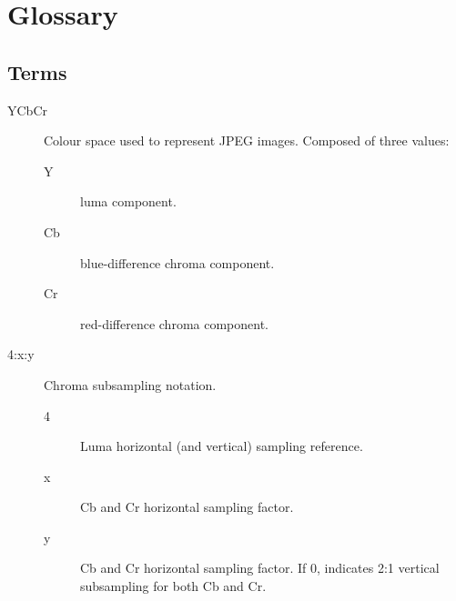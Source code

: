 \documentclass[oneside]{ecsgdp}         %
\begin{document}



\appendix
\backmatter
\chapter{Glossary}

\section*{Terms} 
\begin{description}
	\item[YCbCr] Colour space used to represent JPEG images. Composed of three values:
		\begin{description}
			\item[Y] luma component.
			\item[Cb] blue-difference chroma component.
			\item[Cr] red-difference chroma component.
		\end{description}
	\item[4:x:y]Chroma subsampling notation.
		\begin{description}
			\item[4] Luma horizontal (and vertical) sampling reference.
			\item[x] Cb and Cr horizontal sampling factor.
			\item[y] Cb and Cr horizontal sampling factor. If 0, indicates 2:1 vertical subsampling for both Cb and Cr.
		\end{description}
\end{description}
\end{document}

